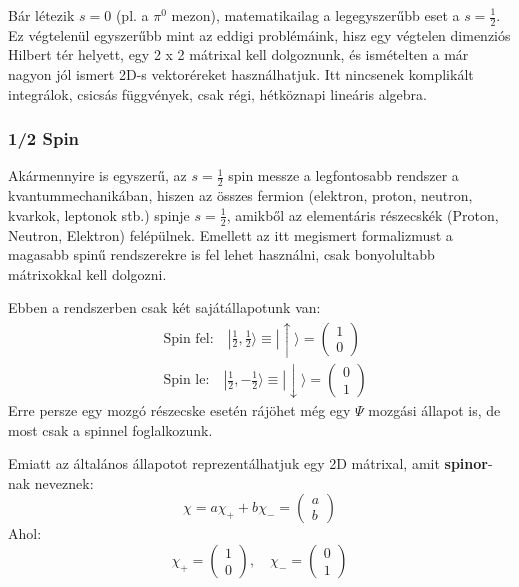 \documentclass[../main.tex]{subfiles}
\begin{document}
Bár létezik $s = 0$ (pl. a $\pi^0$ mezon), matematikailag a legegyszerűbb eset a $s = \frac{1}{2}$. Ez végtelenül egyszerűbb mint az eddigi problémáink, hisz egy végtelen dimenziós Hilbert tér helyett,
egy 2 x 2 mátrixal kell dolgoznunk, és ismételten a már nagyon jól ismert 2D-s vektoréreket használhatjuk. Itt nincsenek komplikált integrálok, csicsás függvények, csak régi, hétköznapi lineáris algebra.

\subsubsection{1/2 Spin}
Akármennyire is egyszerű, az $s = \frac{1}{2}$ spin messze a legfontosabb rendszer a kvantummechanikában, hiszen az összes fermion (elektron, proton, neutron, kvarkok, leptonok stb.) spinje $s = \frac{1}{2}$, amikből az elementáris részecskék (Proton, Neutron, Elektron)
felépülnek. Emellett az itt megismert formalizmust a magasabb spinű rendszerekre is fel lehet használni, csak bonyolultabb mátrixokkal kell dolgozni.

Ebben a rendszerben csak két sajátállapotunk van:
\begin{equation}
    \begin{aligned}
        &\text{Spin fel:} \quad | \tfrac{1}{2}, \tfrac{1}{2} \rangle \equiv | \uparrow \rangle = \begin{pmatrix} 1 \\ 0 \end{pmatrix} \\
        &\text{Spin le:} \quad | \tfrac{1}{2}, -\tfrac{1}{2} \rangle \equiv | \downarrow \rangle = \begin{pmatrix} 0 \\ 1 \end{pmatrix}
    \end{aligned}
\end{equation}
Erre persze egy mozgó részecske esetén rájöhet még egy $\Psi$ mozgási állapot is, de most csak a spinnel foglalkozunk. 

Emiatt az általános állapotot reprezentálhatjuk egy 2D mátrixal, amit \textbf{spinor}-nak neveznek:
\begin{equation}
    \chi = a \chi_+ + b \chi_- = \begin{pmatrix} a \\ b \end{pmatrix}
\end{equation}
Ahol:
\begin{equation}
    \chi_+ = \begin{pmatrix} 1 \\ 0 \end{pmatrix}, \quad \chi_- = \begin{pmatrix} 0 \\ 1 \end{pmatrix}
\end{equation}
\end{document}
